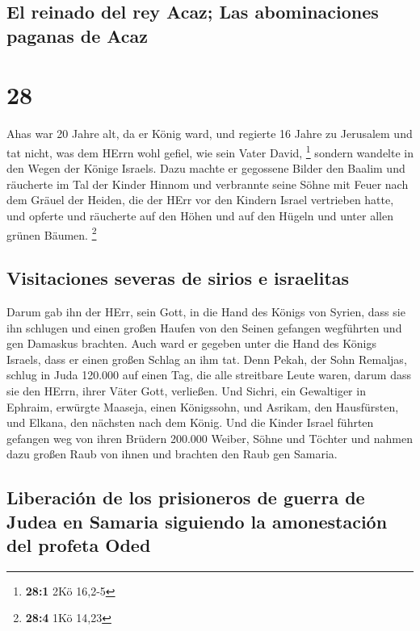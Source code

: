 \hypertarget{el-reinado-del-rey-acaz-las-abominaciones-paganas-de-acaz}{%
\subsection{El reinado del rey Acaz; Las abominaciones paganas de
Acaz}\label{el-reinado-del-rey-acaz-las-abominaciones-paganas-de-acaz}}

\hypertarget{section-27}{%
\section{28}\label{section-27}}

 Ahas war 20 Jahre alt, da er König ward, und regierte 16
Jahre zu Jerusalem und tat nicht, was dem HErrn wohl gefiel, wie sein
Vater David, \footnote{\textbf{28:1} 2Kö 16,2-5}  sondern
wandelte in den Wegen der Könige Israels. Dazu machte er gegossene
Bilder den Baalim  und räucherte im Tal der Kinder Hinnom
und verbrannte seine Söhne mit Feuer nach dem Gräuel der Heiden, die der
HErr vor den Kindern Israel vertrieben hatte,  und opferte
und räucherte auf den Höhen und auf den Hügeln und unter allen grünen
Bäumen. \footnote{\textbf{28:4} 1Kö 14,23}

\hypertarget{visitaciones-severas-de-sirios-e-israelitas}{%
\subsection{Visitaciones severas de sirios e
israelitas}\label{visitaciones-severas-de-sirios-e-israelitas}}

 Darum gab ihn der HErr, sein Gott, in die Hand des Königs
von Syrien, dass sie ihn schlugen und einen großen Haufen von den Seinen
gefangen wegführten und gen Damaskus brachten. Auch ward er gegeben
unter die Hand des Königs Israels, dass er einen großen Schlag an ihm
tat.  Denn Pekah, der Sohn Remaljas, schlug in Juda
120.000 auf einen Tag, die alle streitbare Leute waren, darum dass sie
den HErrn, ihrer Väter Gott, verließen.  Und Sichri, ein
Gewaltiger in Ephraim, erwürgte Maaseja, einen Königssohn, und Asrikam,
den Hausfürsten, und Elkana, den nächsten nach dem König. 
Und die Kinder Israel führten gefangen weg von ihren Brüdern 200.000
Weiber, Söhne und Töchter und nahmen dazu großen Raub von ihnen und
brachten den Raub gen Samaria.

\hypertarget{liberaciuxf3n-de-los-prisioneros-de-guerra-de-judea-en-samaria-siguiendo-la-amonestaciuxf3n-del-profeta-oded}{%
\subsection{Liberación de los prisioneros de guerra de Judea en Samaria
siguiendo la amonestación del profeta
Oded}\label{liberaciuxf3n-de-los-prisioneros-de-guerra-de-judea-en-samaria-siguiendo-la-amonestaciuxf3n-del-profeta-oded}}

